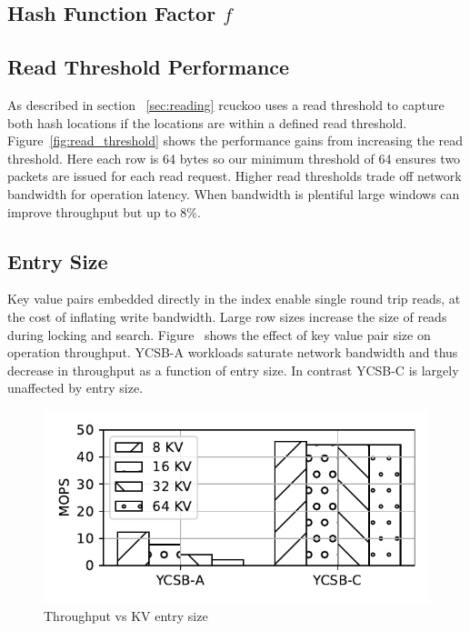 \subsection{Hash Function Factor $f$}


\subsection{Read Threshold Performance}



As described in section ~\ref{sec:reading} rcuckoo uses a
read threshold to capture both hash locations if the
locations are within a defined read threshold.
Figure~\ref{fig:read_threshold} shows the performance gains
from increasing the read threshold. Here each row is 64
bytes so our minimum threshold of 64 ensures two packets are
issued for each read request. Higher read thresholds trade
off network bandwidth for operation latency. When bandwidth
is plentiful large windows can improve throughput but up to
8\%.



\subsection{Entry Size}

Key value pairs embedded directly in the index enable single
round trip reads, at the cost of inflating write bandwidth.
Large row sizes increase the size of reads during locking
and search. Figure~\cite{fig:entry_size} shows the effect of
key value pair size on operation throughput. YCSB-A
workloads saturate network bandwidth and thus decrease in
throughput as a function of entry size. In contrast YCSB-C
is largely unaffected by entry size. 


\begin{figure}[ht]
    \includegraphics[width=0.99\linewidth]{fig/entry_size.pdf}
    \caption{Throughput vs KV entry size}
    \label{fig:entry_size}
\end{figure}

